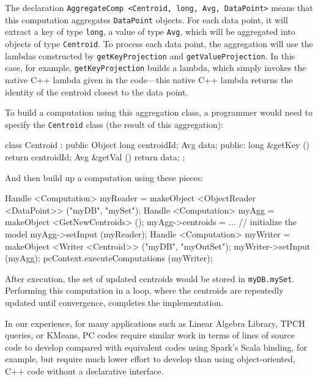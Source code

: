 \noindent 
The declaration \texttt{AggregateComp <Centroid, long, Avg, DataPoint>} means that this computation aggregates
\texttt{DataPoint} objects.  For each data point, it will extract a key of type \texttt{long}, a value of type \texttt{Avg}, which will be
aggregated into objects of type \texttt{Centroid}.  To process each data point, the aggregation will use the lambdas constructed by
\texttt{getKeyProjection} and \texttt{getValueProjection}.  
In this case, for example,
\texttt{getKeyProjection} builds a lambda, which simply invokes the native C++ lambda given in the code---this
native C++ lambda returns the identity of the centroid closest to the data point.

To build a computation using this aggregation class, a programmer would need to specify the \texttt{Centroid} class (the result of this aggregation):

\begin{code}
class Centroid : public Object {
	long centroidId; 
	Avg data;
public:
	long &getKey () {return centroidId;}
	Avg &getVal () {return data;}
};
\end{code}

\noindent
And then build up a computation using these pieces:

\begin{code}
Handle <Computation> myReader = 
    makeObject <ObjectReader <DataPoint>> ("myDB", "mySet");
Handle <Computation> myAgg = makeObject <GetNewCentroids> ();
myAgg->centroids = ... // initialize the model
myAgg->setInput (myReader);
Handle <Computation> myWriter =  makeObject <Writer <Centroid>> ("myDB", "myOutSet");
    myWriter->setInput (myAgg);
pcContext.executeComputations (myWriter);
\end{code}

\noindent After execution, the set of updated centroids would be stored in \texttt{myDB.mySet}.
Performing this computation in a loop, where the centroids are repeatedly updated until convergence, completes the implementation.

In our experience, for many applications such as Linear Algebra
Library, TPCH queries, or KMeans, PC codes require similar work in
terms of lines of source code to develop compared with equivalent codes using Spark's Scala binding, for
example, but require much lower effort to develop than using
object-oriented, C++ code without a declarative interface.


